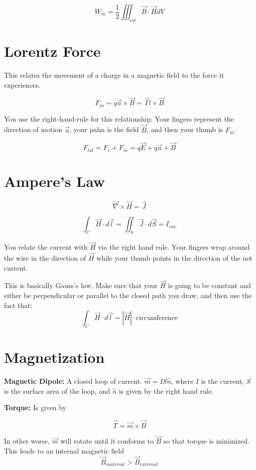 \documentclass[a4paper,12pt]{report}
\begin{document}
$$W_m = \frac{1}{2} \iiint_{vol} \vec B \cdot \vec H dV$$

\section{Lorentz Force}

This relates the movement of a charge in a magnetic field to the force it experiences.

$$F_m = q\vec u \times \vec B = \vec I l \times \vec B$$

You use the right-hand-rule for this relationship: Your fingers represent the direction of motion $\vec u$, your palm is the field $\vec B$, and then your thumb is $F_m$. 

$$F_{tot} = F_e + F_m = q\vec E + q \vec u + \vec B$$


\section{Ampere's Law} 

$$\vec \nabla \times \vec H = \vec J$$

$$\int_C \vec H \cdot d\vec l = \iint_S \vec J \cdot d\vec S = I_{enc}$$

You relate the current with $\vec H$ via the right hand rule. Your fingers wrap around the wire in the direction of $\vec{H}$ while your thumb points in the direction of the net current.

This is basically Gauss's law. Make sure that your $\vec H$ is going to be constant and either be perpendicular or parallel to the closed path you draw, and then use the fact that:   $$\int_C \vec H \cdot d\vec l = |\vec{H}| \cdot \text{circumference}$$ 



\section{Magnetization}

\textbf{Magnetic Dipole: } A closed loop of current. $\vec m = I S \hat n$, where $I$ is the current, $S$ is the surface area of the loop, and $\hat n$ is given by the right hand rule. 

\textbf{Torque: } Is given by 

$$\vec T = \vec m \times \vec B$$

In other worse, $\vec m$ will rotate until it conforms to $\vec B$ so that torque is minimized. This leads to an internal magnetic field $$\vec B_{material} > \vec B_{external}$$
\end{document}
